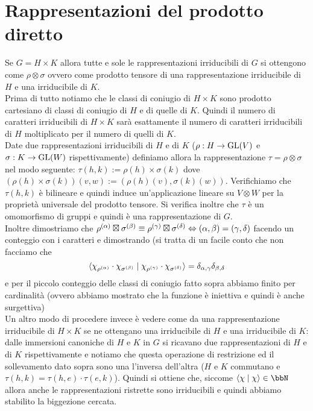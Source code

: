 \documentclass[a4paper,NoNotes,GeneralMath]{stdmdoc}
\begin{document}
	\section{Rappresentazioni del prodotto diretto}
	Se $G = H \times K$ allora tutte e sole le rappresentazioni irriducibili di $G$ si ottengono come $\rho \otimes \sigma$ ovvero come prodotto tensore di una rappresentazione irriducibile di $H$ e una irriducibile di $K$. \\
	Prima di tutto notiamo che le classi di coniugio di $H \times K$ sono prodotto cartesiano di classi di coniugio di $H$ e di quelle di $K$. Quindi il numero di caratteri irriducibili di $H \times K$ sarà esattamente il numero di caratteri irriducibili di $H$ moltiplicato per il numero di quelli di $K$. \\ Date due rappresentazioni irriducibili di $H$ e di $K$ ($\rho: H \rightarrow \mbox{GL}(V)$ e $\sigma: K \rightarrow \mbox{GL}(W)$ rispettivamente) definiamo allora la rappresentazione $\tau = \rho \otimes \sigma$ nel modo seguente: $\tau (h, k) := \rho(h) \times \sigma(k)$ dove $(\rho(h) \times \sigma(k))(v, w) := (\rho(h)(v), \sigma(k)(w))$. Verifichiamo che $\tau(h,k)$ è bilineare e quindi induce un'applicazione lineare su $V \otimes W$ per la proprietà universale del prodotto tensore. Si verifica inoltre che $\tau$ è un omomorfismo di gruppi e quindi è una rappresentazione di $G$. \\
	Inoltre dimostriamo che $\rho^{(\alpha)} \boxtimes \sigma^{(\beta)} \equiv \rho^{(\gamma)} \boxtimes \sigma^{(\delta)} \Leftrightarrow (\alpha, \beta) = (\gamma, \delta)$ facendo un conteggio con i caratteri e dimostrando (si tratta di un facile conto che non facciamo che $$ \langle \chi_{\rho^{(\alpha)}}\cdot \chi_{\sigma^{(\beta)}} \mid \chi_{\rho^{(\gamma)}}\cdot\chi_{\sigma^{(\delta)}} \rangle = \delta_{\alpha,\gamma}\delta_{\beta,\delta}$$
	e per il piccolo conteggio delle classi di coniugio fatto sopra abbiamo finito per cardinalità (ovvero abbiamo mostrato che la funzione è iniettiva e quindi è anche surgettiva) \\
	Un altro modo di procedere invece è vedere come da una rappresentazione irriducibile di $H \times K$ se ne ottengano una irriducibile di $H$ e una irriducibile di $K$: dalle immersioni canoniche di $H$ e $K$ in $G$ si ricavano due rappresentazioni di $H$ e di $K$ rispettivamente e notiamo che questa operazione di restrizione ed il sollevamento dato sopra sono una l'inversa dell'altra ($H$ e $K$ commutano e $\tau(h,k) = \tau(h,e) \cdot \tau(e,k)$). Quindi si ottiene che, siccome $\scal{\chi}{\chi} \in \bbN$ allora anche le rappresentazioni ristrette sono irriducibili e quindi abbiamo stabilito la biggezione cercata.
\end{document}
